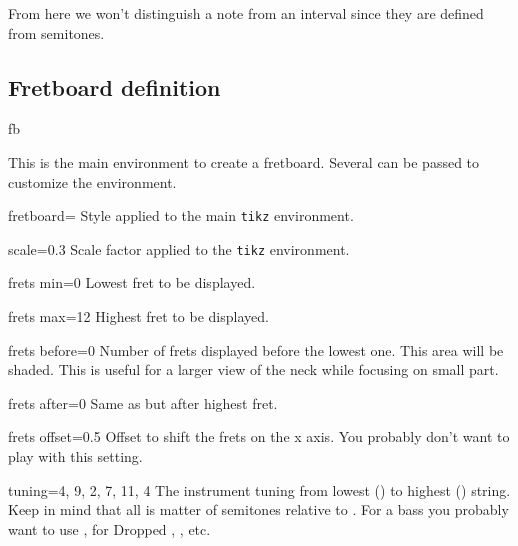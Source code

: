 \documentclass[a4paper]{article}
\newcommand{\pkg}[1]{\texttt{#1}}
\begin{document}
From here we won't distinguish a note from an interval since they are
defined from semitones.

\subsection{Fretboard definition}

\begin{docEnvironment}{fb}{}

This is the main environment to create a fretboard. Several 
can be passed to customize the environment.

\begin{docKey}[fb][]{fretboard}{=}{}
  Style applied to the main \pkg{tikz} environment.
\end{docKey}

\begin{docKey}[fb][]{scale}{=}{0.3}
  Scale factor applied to the \pkg{tikz} environment.
\end{docKey}

\begin{docKey}[fb][]{frets min}{=}{0}
  Lowest fret to be displayed.
\end{docKey}

\begin{docKey}[fb][]{frets max}{=}{12}
  Highest fret to be displayed.
\end{docKey}

\begin{docKey}[fb][]{frets before}{=}{0}
  Number of frets displayed before the lowest one. This area will be
  shaded. This is useful for a larger view of the neck while focusing on
  small part.
\end{docKey}

\begin{docKey}[fb][]{frets after}{=}{0}
  Same as  but after highest fret.
\end{docKey}

\begin{docKey}[fb][]{frets offset}{=}{0.5}
  Offset to shift the frets on the x axis. You probably don't want to play
  with this setting.
\end{docKey}

\begin{docKey}[fb][]{tuning}{=}{{4, 9, 2, 7, 11, 4}}
  The instrument tuning from lowest () to highest ()
  string. Keep in mind that all is matter of semitones relative to \pC. For
  a bass you probably want to use , for Dropped \pD, 
  , etc.
\end{docKey}


\end{docEnvironment}
\end{document}
